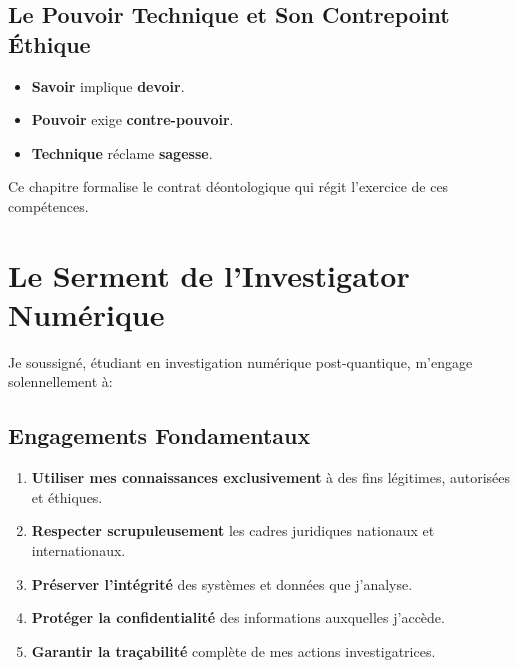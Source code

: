 \documentclass[11pt,a4paper,oneside]{book}
\begin{document}
        \subsection*{Le Pouvoir Technique et Son Contrepoint Éthique}
        \begin{itemize}
            \item \textbf{Savoir} implique \textbf{devoir}.
            \item \textbf{Pouvoir} exige \textbf{contre-pouvoir}.
            \item \textbf{Technique} réclame \textbf{sagesse}.
        \end{itemize}

        Ce chapitre formalise le contrat déontologique qui régit l'exercice de ces compétences.

        \section*{Le Serment de l'Investigator Numérique}
        Je soussigné, étudiant en investigation numérique post-quantique, m'engage solennellement à:

        \subsection*{Engagements Fondamentaux}
        \begin{enumerate}
            \item \textbf{Utiliser mes connaissances exclusivement} à des fins légitimes, autorisées et éthiques.
            \item \textbf{Respecter scrupuleusement} les cadres juridiques nationaux et internationaux.
            \item \textbf{Préserver l'intégrité} des systèmes et données que j'analyse.
            \item \textbf{Protéger la confidentialité} des informations auxquelles j'accède.
            \item \textbf{Garantir la traçabilité} complète de mes actions investigatrices.
        \end{enumerate}
\end{document}
